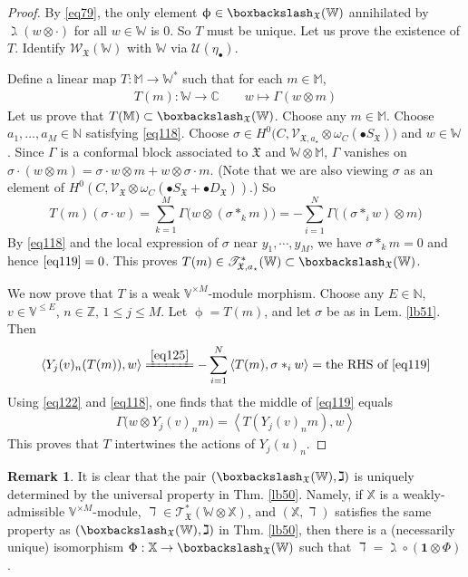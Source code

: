 \documentclass[11pt,b5paper,notitlepage]{article}
\theoremstyle{definition}
\newtheorem{rem}[df]{Remark}
\theoremstyle{plain}
\newcommand{\fk}{\mathfrak}
\newcommand{\mc}{\mathcal}
\newcommand{\idt}{\mathbf{1}}
\newcommand{\SV}{\mathscr{V}}
\newcommand{\scr}{\mathscr}
\newcommand{\SX}{{S_{\fk X}}}
\newcommand{\DX}{D_{\fk X}}
\newcommand{\blt}{\bullet}
\newcommand{\Vbb}{\mathbb V}
\newcommand{\Xbb}{\mathbb X}
\newcommand{\Wbb}{\mathbb W}
\newcommand{\Mbb}{\mathbb M}
\newcommand{\Cbb}{\mathbb C}
\newcommand{\Nbb}{\mathbb N}
\newcommand{\Zbb}{\mathbb Z}
\newcommand{\<}{\left\langle}
\renewcommand{\>}{\right\rangle}
\newcommand{\fx}{\mathfrak{X}}
\newcommand{\ST}{\mathscr{T}}
\newcommand{\bbs}{\boxbackslash}
\numberwithin{equation}{section}
\begin{document}
\begin{proof}
By \eqref{eq79}, the only element $\upphi\in\bbs_\fx(\Wbb)$ annihilated by $\gimel(w\otimes\cdot)$ for all $w\in\Wbb$ is $0$. So $T$ must be unique. Let us prove the existence of $T$. Identify $\scr W_\fx(\Wbb)$ with $\Wbb$ via $\mc U(\eta_\blt)$.

Define a linear map $T:\Mbb\rightarrow\Wbb^*$ such that for each $m\in\Mbb$, 
\begin{gather*}
T(m):\Wbb\rightarrow\Cbb\qquad w\mapsto \Gamma(w\otimes m)
\end{gather*}
Let us prove that $T(\Mbb)\subset\bbs_\fx(\Wbb)$. Choose any $m\in\Mbb$. Choose $a_1,\dots,a_M\in\Nbb$ satisfying \eqref{eq118}. Choose  $\sigma\in H^0\big(C,\SV_{\fx,a_\star}\otimes \omega_C(\bullet S_\fx)\big)$ and $w\in \Wbb$. Since $\Gamma$ is a conformal block associated to $\fk X$ and $\Wbb\otimes\Mbb$, $\Gamma$ vanishes on $\sigma\cdot (w\otimes m)=\sigma\cdot w\otimes m+w\otimes\sigma\cdot m$. (Note that we are also viewing $\sigma$ as an element of $H^0(C,\scr V_\fx\otimes\omega_C(\blt\SX+\blt\DX))$.) So 
    \begin{equation}\label{eq119}
    T(m)(\sigma\cdot w)=\sum_{k=1}^M\Gamma\big(w\otimes(\sigma*_k m)\big)=-\sum_{i=1}^N \Gamma\big((\sigma*_i w)\otimes m\big)
    \end{equation}
By \eqref{eq118} and the local expression of $\sigma$ near $y_1,\cdots, y_M$, we have $\sigma*_k m=0$ and hence $\eqref{eq119}=0$. This proves $T(m)\in \ST_{\fx,a_\star}^*(\Wbb)\subset\bbs_\fx(\Wbb)$. 


We now prove that $T$ is a weak $\Vbb^{\times M}$-module morphism. Choose any $E\in\Nbb$,  $v\in\Vbb^{\leq E}$, $n\in\Zbb$, $1\leq j\leq M$. Let $\upphi=T(m)$, and let $\sigma$ be as in Lem. \ref{lb51}. Then
\begin{align*}
\<Y_j(v)_n(T(m)),w\>\xlongequal{\eqref{eq125}}-\sum_{i=1}^N \<T(m), \sigma*_i w\>=\text{the RHS of }\eqref{eq119}
\end{align*}
Using \eqref{eq122} and \eqref{eq118}, one finds that the middle of \eqref{eq119} equals
\begin{align*}
\Gamma\big(w\otimes Y_j(v)_n m \big)=\<T(Y_j(v)_nm),w\>
\end{align*}
This proves that $T$ intertwines the actions of $Y_j(u)_n$.
\end{proof}



\begin{rem}\label{fusion-uniqueness}
It is clear that the pair $(\bbs_\fx(\Wbb),\gimel)$ is uniquely determined by the universal property in Thm. \ref{lb50}. Namely, if $\Xbb$ is a weakly-admissible $\Vbb^{\times M}$-module, $\daleth\in\scr T_{\fk X}^*(\Wbb\otimes\Xbb)$, and $(\Xbb,\daleth)$ satisfies the same property as $(\bbs_\fx(\Wbb),\gimel)$ in Thm. \ref{lb50}, then there is a (necessarily unique) isomorphism $\Phi:\Xbb\rightarrow\bbs_\fx(\Wbb)$ such that $\daleth=\gimel\circ(\idt\otimes\Phi)$. 
\end{rem}
\end{document}
